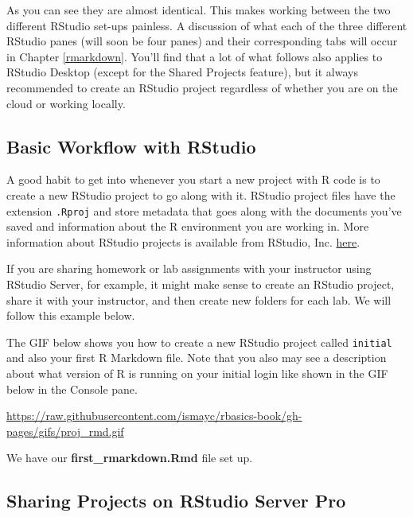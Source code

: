 \documentclass[]{tufte-book}
\theoremstyle{definition}
\theoremstyle{definition}
\theoremstyle{remark}
\begin{document}
As you can see they are almost identical. This makes working between the
two different RStudio set-ups painless. A discussion of what each of the
three different RStudio panes (will soon be four panes) and their
corresponding tabs will occur in Chapter \ref{rmarkdown}. You'll find
that a lot of what follows also applies to RStudio Desktop (except for
the Shared Projects feature), but it always recommended to create an
RStudio project regardless of whether you are on the cloud or working
locally.

\subsection{Basic Workflow with
RStudio}\label{basic-workflow-with-rstudio}

A good habit to get into whenever you start a new project with R code is
to create a new RStudio project to go along with it. RStudio project
files have the extension \texttt{.Rproj} and store metadata that goes
along with the documents you've saved and information about the R
environment you are working in. More information about RStudio projects
is available from RStudio, Inc.
\href{https://support.rstudio.com/hc/en-us/articles/200526207-Using-Projects}{here}.

If you are sharing homework or lab assignments with your instructor
using RStudio Server, for example, it might make sense to create an
RStudio project, share it with your instructor, and then create new
folders for each lab. We will follow this example below.

The GIF below shows you how to create a new RStudio project called
\texttt{initial} and also your first R Markdown file. Note that you also
may see a description about what version of R is running on your initial
login like shown in the GIF below in the Console pane.

\vspace{0.1in}

\begin{center}\footnotesize{\url{https://raw.githubusercontent.com/ismayc/rbasics-book/gh-pages/gifs/proj_rmd.gif}}\end{center}

\vspace{0.1in}

We have our \textbf{first\_rmarkdown.Rmd} file set up.

\subsection{Sharing Projects on RStudio Server
Pro}\label{sharing-projects-on-rstudio-server-pro}
\end{document}
